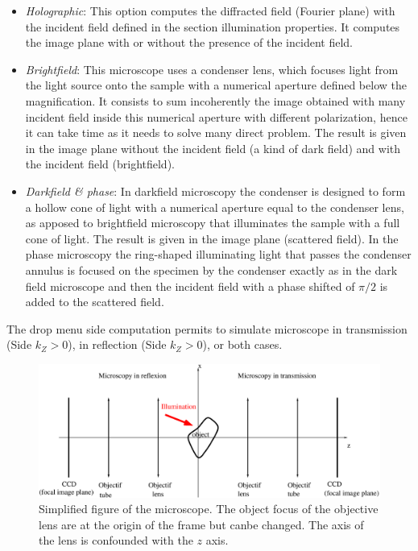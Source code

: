 \begin{itemize}

\item {\it Holographic}: This option computes the diffracted field
  (Fourier plane) with the incident field defined in the section
  illumination properties. It computes the image plane with or without
  the presence of the incident field.


  
\item {\it Brightfield}: This microscope uses a condenser lens, which
  focuses light from the light source onto the sample with a numerical
  aperture defined below the magnification. It consists to sum
  incoherently the image obtained with many incident field inside this
  numerical aperture with different polarization, hence it can take
  time as it needs to solve many direct problem. The result is given
  in the image plane without the incident field (a kind of dark field)
  and with the incident field (brightfield).

\item {\it Darkfield \& phase}: In darkfield microscopy the condenser
  is designed to form a hollow cone of light with a numerical aperture
  equal to the condenser lens, as apposed to brightfield microscopy
  that illuminates the sample with a full cone of light. The result is
  given in the image plane (scattered field). In the phase microscopy
  the ring-shaped illuminating light that passes the condenser annulus
  is focused on the specimen by the condenser exactly as in the dark
  field microscope and then the incident field with a phase shifted of
  $\pi/2$ is added to the scattered field.
  
\end{itemize}

The drop menu side computation permits to simulate microscope in
transmission (Side $k_Z>0$), in reflection (Side $k_Z>0$), or both
cases. 


\begin{figure}[h]
\begin{center}
\includegraphics*[draft=false,width=150mm]{microscopie.eps}
\caption{Simplified figure of the microscope. The object focus of the
  objective lens are at the origin of the frame but canbe changed. The
  axis of the lens is confounded with the $z$ axis.}
\label{lentille}
\end{center}
\end{figure}


